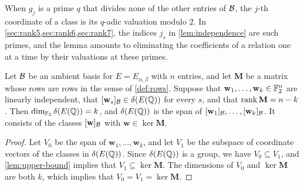 When $g_j$ is a prime $q$ that divides none of the other entries of $\mathcal B$, the $j$-th coordinate of a class is its $q$-adic valuation modulo $2$. In \cref{sec:rank5,sec:rank6,sec:rank7}, the indices $j_s$ in \cref{lem:independence} are such primes, and the lemma amounts to eliminating the coefficients of a relation one at a time by their valuations at these primes.

\begin{corollary}\label{cor:exact-dimension}
Let $\mathcal B$ be an ambient basis for $E=E_{\alpha,\beta}$ with $n$ entries, and let $\mathbf M$ be a matrix whose rows are rows in the sense of \cref{def:rows}. Suppose that $\mathbf w_1,\dots,\mathbf w_k\in\mathbb F_2^n$ are linearly independent, that $[\mathbf w_s]_{\mathcal B}\in\delta(E(\mathbb Q))$ for every $s$, and that $\operatorname{rank}\mathbf M=n-k$. Then $\dim_{\mathbb F_2}\delta(E(\mathbb Q))=k$, and $\delta(E(\mathbb Q))$ is the span of $[\mathbf w_1]_{\mathcal B},\dots,[\mathbf w_k]_{\mathcal B}$. It consists of the classes $[\mathbf w]_{\mathcal B}$ with $\mathbf w\in\ker\mathbf M$.
\end{corollary}

\begin{proof}
Let $V_0$ be the span of $\mathbf w_1,\dots,\mathbf w_k$, and let $V_1$ be the subspace of coordinate vectors of the classes in $\delta(E(\mathbb Q))$. Since $\delta(E(\mathbb Q))$ is a group, we have $V_0\subseteq V_1$, and \cref{lem:upper-bound} implies that $V_1\subseteq\ker\mathbf M$. The dimensions of $V_0$ and $\ker\mathbf M$ are both $k$, which implies that $V_0=V_1=\ker\mathbf M$.
\end{proof}
